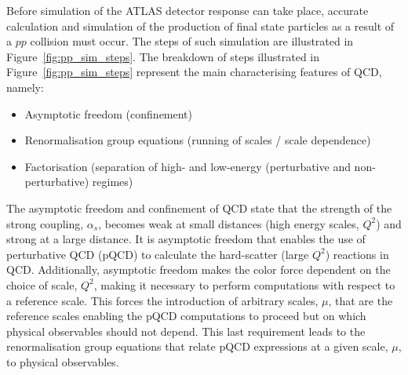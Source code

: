 Before simulation of the ATLAS detector response can take place, accurate calculation and simulation of the production of final
state particles as a result of a $pp$ collision must occur.
The steps of such simulation are illustrated in Figure~\ref{fig:pp_sim_steps}.
The breakdown of steps illustrated in Figure~\ref{fig:pp_sim_steps} represent the main characterising features
of QCD, namely: 
\begin{itemize}
    \item Asymptotic freedom (confinement)
    \item Renormalisation group equations (running of scales / scale dependence)
    \item Factorisation (separation of high- and low-energy (perturbative and non-perturbative) regimes)
\end{itemize}

The asymptotic freedom and confinement of QCD state that the strength of the strong coupling, $\alpha_s$, becomes weak at
small distances (high energy scales, $Q^2$) and strong at a large distance.
It is asymptotic freedom that enables the use of perturbative QCD (pQCD) to calculate the hard-scatter (large $Q^2$)
reactions in QCD. Additionally, asymptotic freedom makes the color force dependent on the choice of scale, $Q^2$,
making it necessary to perform computations with respect to a reference scale.
This forces the introduction of arbitrary scales, $\mu$, that are the reference scales enabling the pQCD computations
to proceed but on which physical observables should not depend.
This last requirement leads to the renormalisation group equations that relate pQCD expressions at a given
scale, $\mu$, to physical observables.

